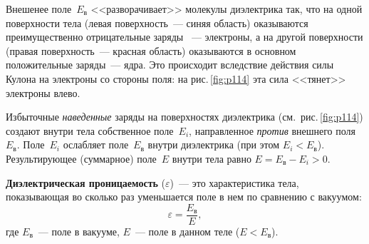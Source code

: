 \documentclass[main.tex]{subfiles}
\begin{document}
Внешенее поле~$E_\text{в}$ <<разворачивает>> молекулы диэлектрика так, что на одной поверхности тела (левая поверхность~--- синяя область) оказываются преимущественно отрицательные заряды ~--- электроны, а на другой поверхности (правая поверхность~--- красная область) оказываются в основном положительные заряды~--- ядра. Это происходит вследствие действия силы Кулона на электроны со стороны поля: на рис.\,\ref{fig:p114} эта сила <<тянет>> электроны влево.  

Избыточные \emph{наведенные} заряды на поверхностях диэлектрика (см.~рис.\,\ref{fig:p114}) создают внутри тела собственное поле~$E_i$, направленное \emph{против} внешнего поля~$E_\text{в}$. Поле~$E_i$ ослабляет поле~$E_\text{в}$ внутри диэлектрика (при этом $E_i<E_\text{в}$). Результирующее (суммарное) поле~$E$ внутри тела равно $E=E_\text{в}-E_i>0$. 

\textbf{Диэлектрическая проницаемость} ($\varepsilon$)~--- это характеристика тела, показывающая во сколько раз уменьшается поле в нем по сравнению с вакуумом:
\begin{equation}
    \varepsilon=\frac{E_\text{в}}{E},
\end{equation}
где $E_\text{в}$~--- поле в вакууме, $E$~--- поле в данном теле ($E<E_\text{в}$).


 
\end{document}
